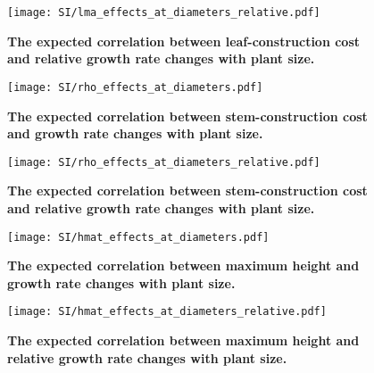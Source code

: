 \documentclass[10pt,twoside]{article}\usepackage[]{graphicx}\usepackage[]{color}
\begin{document}
\begin{figure}[ht]
\centering
\texttt{[image: SI/lma\_effects\_at\_diameters\_relative.pdf]}
\caption{\textbf{The expected correlation between leaf-construction cost
and relative growth rate changes with plant size.}
\label{f-lma_growth_size_relative}}
\end{figure}

\begin{figure}[ht]
\centering
\texttt{[image: SI/rho\_effects\_at\_diameters.pdf]}
\caption{\textbf{The expected correlation between stem-construction cost
and growth rate changes with plant size.} \label{f-rho_growth_size}}
\end{figure}

\begin{figure}[ht]
\centering
\texttt{[image: SI/rho\_effects\_at\_diameters\_relative.pdf]}
\caption{\textbf{The expected correlation between stem-construction cost
and relative growth rate changes with plant size.}
\label{f-rho_growth_size_relative}}
\end{figure}

\begin{figure}[ht]
\centering
\texttt{[image: SI/hmat\_effects\_at\_diameters.pdf]}
\caption{\textbf{The expected correlation between maximum height and
growth rate changes with plant size.} \label{f-hmat_growth_size}}
\end{figure}

\begin{figure}[ht]
\centering
\texttt{[image: SI/hmat\_effects\_at\_diameters\_relative.pdf]}
\caption{\textbf{The expected correlation between maximum height and
relative growth rate changes with plant size.}
\label{f-hmat_growth_size_relative}}
\end{figure}




\clearpage


\end{document}
